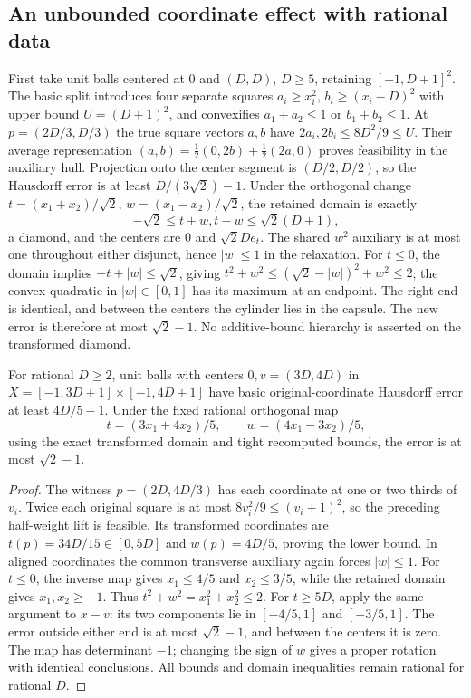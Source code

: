 \subsection{An unbounded coordinate effect with rational data}
First take unit balls centered at $0$ and $(D,D)$, $D\ge5$, retaining
$[-1,D+1]^2$. The basic split introduces four separate squares
$a_i\ge x_i^2$, $b_i\ge(x_i-D)^2$ with upper bound $U=(D+1)^2$,
and convexifies $a_1+a_2\le1$ or $b_1+b_2\le1$.
At $p=(2D/3,D/3)$ the true square vectors $a,b$ have
$2a_i,2b_i\le8D^2/9\le U$. Their average representation
$(a,b)=\tfrac12(0,2b)+\tfrac12(2a,0)$ proves feasibility in the
auxiliary hull. Projection onto the center segment is $(D/2,D/2)$,
so the Hausdorff error is at least $D/(3\sqrt2)-1$.
Under the orthogonal change $t=(x_1+x_2)/\sqrt2$,
$w=(x_1-x_2)/\sqrt2$, the retained domain is exactly
\[
 -\sqrt2\le t+w,t-w\le\sqrt2(D+1),
\]
a diamond, and the centers are $0$ and $\sqrt2D e_t$. The shared $w^2$
auxiliary is at most one throughout either disjunct, hence $|w|\le1$
in the relaxation. For $t\le0$, the domain implies
$-t+|w|\le\sqrt2$, giving
$t^2+w^2\le(\sqrt2-|w|)^2+w^2\le2$; the convex quadratic in
$|w|\in[0,1]$ has its maximum at an endpoint. The right end is
identical, and between the centers the cylinder lies in the capsule.
The new error is therefore at most $\sqrt2-1$. No additive-bound
hierarchy is asserted on the transformed diamond.

\begin{proposition}\label{prop:psplit-rational}
For rational $D\ge2$, unit balls with centers $0,v=(3D,4D)$ in
$X=[-1,3D+1]\times[-1,4D+1]$ have basic original-coordinate Hausdorff
error at least $4D/5-1$. Under the fixed rational orthogonal map
\begin{equation}\label{eq:psplit-rational-map}
 t=(3x_1+4x_2)/5,\qquad w=(4x_1-3x_2)/5,
\end{equation}
using the exact transformed domain and tight recomputed bounds, the error
is at most $\sqrt2-1$.
\end{proposition}
\begin{proof}
The witness $p=(2D,4D/3)$ has each coordinate at one or two thirds of
$v_i$. Twice each original square is at most $8v_i^2/9\le(v_i+1)^2$,
so the preceding half-weight lift is feasible. Its transformed coordinates
are $t(p)=34D/15\in[0,5D]$ and $w(p)=4D/5$, proving the lower bound.
In aligned coordinates the common transverse auxiliary again forces
$|w|\le1$. For $t\le0$, the inverse map gives $x_1\le4/5$ and
$x_2\le3/5$, while the retained domain gives $x_1,x_2\ge-1$.
Thus $t^2+w^2=x_1^2+x_2^2\le2$. For $t\ge5D$, apply the same argument
to $x-v$: its two components lie in $[-4/5,1]$ and $[-3/5,1]$.
The error outside either end is at most $\sqrt2-1$, and between the
centers it is zero. The map has determinant $-1$; changing the sign of $w$
gives a proper rotation with identical conclusions. All bounds and domain
inequalities remain rational for rational $D$.
\end{proof}

